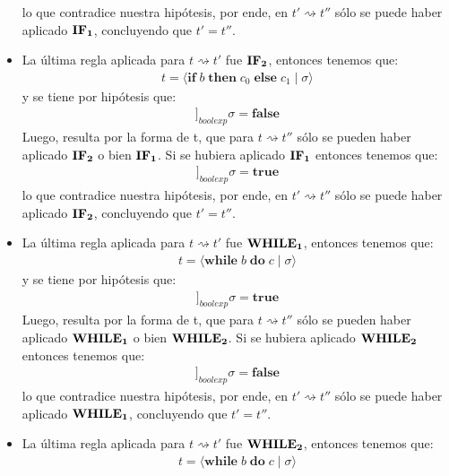 \documentclass[a4paper,10pt]{article}
\begin{document}
\begin{itemize}
			lo que contradice nuestra hipótesis, por ende, en $t' \rightsquigarrow t''$ sólo se puede haber aplicado ${\bf IF_{1}}$, concluyendo que $t'= t''$.
			\\
		\item La última regla aplicada para $t \rightsquigarrow t'$ fue ${\bf IF_{2}}$, entonces tenemos que:
				\begin{align*} t = \langle \textbf{if}\; b \;\textbf{then}\; c_{0} \;\textbf{else}\; c_{1} \;|\; \sigma\rangle \end{align*}
			y se tiene por hipótesis que: 
				\begin{align*} [\![b]\!]_{boolexp}\sigma = \textbf{false} \end{align*}
			Luego, resulta por la forma de t, que para $t \rightsquigarrow t''$ sólo se pueden haber aplicado ${\bf IF_{2}}$ o bien ${\bf IF_{1}}$.
			Si se hubiera aplicado ${\bf IF_{1}}$ entonces tenemos que:
				\begin{align*} [\![b]\!]_{boolexp}\sigma = \textbf{true} \end{align*}
			lo que contradice nuestra hipótesis, por ende, en $t' \rightsquigarrow t''$ sólo se puede haber aplicado ${\bf IF_{2}}$, concluyendo que $t'= t''$.
			\\
\pagebreak
		\item La última regla aplicada para $t \rightsquigarrow t'$ fue ${\bf WHILE_{1}}$, entonces tenemos que:
				\begin{align*} t = \langle \textbf{while}\; b \;\textbf{do}\; c \;|\; \sigma\rangle \end{align*}
			y se tiene por hipótesis que:
				\begin{align*} [\![b]\!]_{boolexp}\sigma = \textbf{true} \end{align*}
			Luego, resulta por la forma de t, que para $t \rightsquigarrow t''$ sólo se pueden haber aplicado ${\bf WHILE_{1}}$ o bien ${\bf WHILE_{2}}$.
			Si se hubiera aplicado ${\bf WHILE_{2}}$ entonces tenemos que:
				\begin{align*} [\![b]\!]_{boolexp}\sigma = \textbf{false} \end{align*}
			lo que contradice nuestra hipótesis, por ende, en $t' \rightsquigarrow t''$ sólo se puede haber aplicado ${\bf WHILE_{1}}$, concluyendo que $t'= t''$.
			\\
		\item La última regla aplicada para $t \rightsquigarrow t'$ fue ${\bf WHILE_{2}}$, entonces tenemos que:
				\begin{align*} t = \langle \textbf{while}\; b \;\textbf{do}\; c \;|\; \sigma\rangle \end{align*}

\end{itemize}
\end{document}
